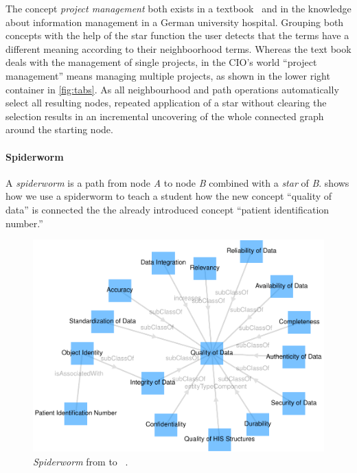 \documentclass[conference]{IEEEtran}
\begin{document}
The concept \emph{project management} both exists in a textbook~\cite{ob} and in the knowledge about information management in a German university hospital.
Grouping both concepts with the help of the star function the user detects that the terms have a different meaning according to their neighboorhood terms.
Whereas the text book deals with the management of single projects, in the CIO's world \enquote{project management} means managing multiple projects, as shown in the lower right container in \cref{fig:tabs}.
As all neighbourhood and path operations automatically select all resulting nodes, repeated application of a star without clearing the selection results in an incremental uncovering of the whole connected graph around the starting node.

\paragraph{Spiderworm}
A \emph{spiderworm} is a path from node \emph{A} to node \emph{B} combined with a \emph{star} of \emph{B}.
 shows how we use a spiderworm to teach a student how the new concept \enquote{quality of data} is connected the the already introduced concept \enquote{patient identification number.}

\begin{figure}[h!]
    \centering
    \includegraphics[width=\columnwidth]{img/spiderworm.pdf}
    \caption{\emph{Spiderworm} from  to ~\cite{snikgraphposter}.}
	\label{fig:spiderworm}
\end{figure}
\vspace{-3pt}
\end{document}
